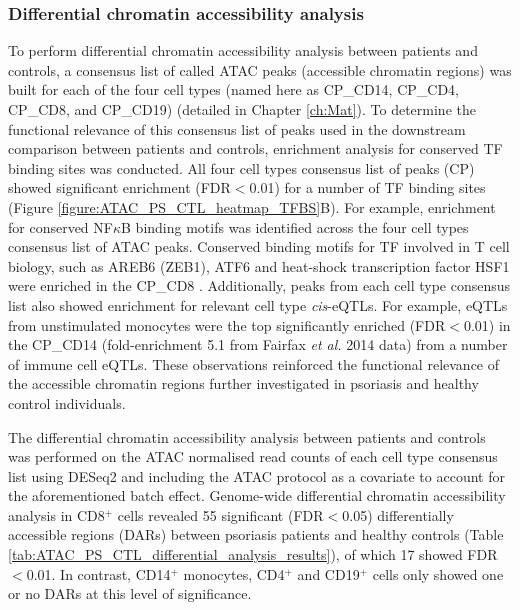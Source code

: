\subsubsection{Differential chromatin accessibility analysis}

To perform differential chromatin accessibility analysis between patients and controls, a consensus list of called ATAC peaks (accessible chromatin regions) was built for each of the four cell types (named here as CP\_CD14, CP\_CD4, CP\_CD8, and CP\_CD19) (detailed in Chapter \ref{ch:Mat}). To determine the functional relevance of this consensus list of peaks used in the downstream comparison between patients and controls, enrichment analysis for conserved TF binding sites was conducted. All four cell types consensus list of peaks (CP) showed significant enrichment (FDR$<$0.01) for a number of TF binding sites (Figure \ref{figure:ATAC_PS_CTL_heatmap_TFBS}B). For example, enrichment for conserved NF$\kappa$B binding motifs was identified across the four cell types consensus list of ATAC peaks. Conserved binding motifs for TF involved in T cell biology, such as AREB6 (ZEB1), ATF6 and heat-shock transcription factor HSF1 were enriched in the CP\_CD8 \parencite{Guan2018,Yamazaki2009,Gandhapudi2013}. Additionally, peaks from each cell type consensus list also showed enrichment for relevant cell type \textit{cis}-eQTLs. For example, eQTLs from unstimulated monocytes were the top significantly enriched (FDR$<$0.01) in the CP\_CD14 (fold-enrichment 5.1 from Fairfax \textit{et al.} 2014 data) from a number of immune cell eQTLs. These observations reinforced the functional relevance of the accessible chromatin regions further investigated in psoriasis and healthy control individuals.

The differential chromatin accessibility analysis between patients and controls was performed on the ATAC normalised read counts of each cell type consensus list using DESeq2 and including the ATAC protocol as a covariate to account for the aforementioned  batch effect. Genome-wide differential chromatin accessibility analysis in CD8$^+$ cells revealed 55 significant (FDR$<$0.05) differentially accessible regions (DARs) between psoriasis patients and healthy controls (Table \ref{tab:ATAC_PS_CTL_differential_analysis_results}), of which 17 showed FDR$<$0.01. In contrast, CD14$^+$ monocytes, CD4$^+$ and CD19$^+$ cells only showed one or no DARs at this level of significance. 



